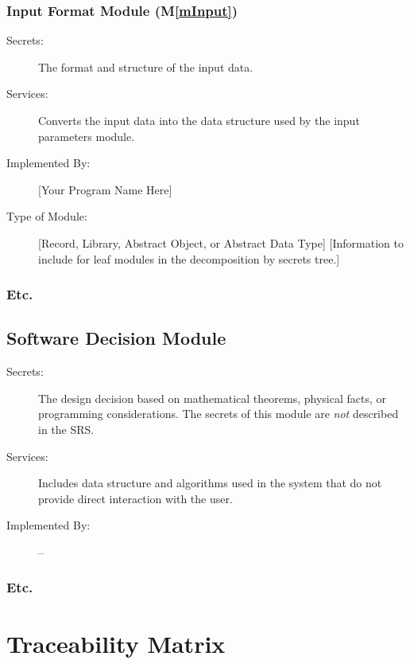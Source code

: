 \documentclass[12pt, titlepage]{article}
\newcommand{\mref}[1]{M\ref{#1}}
\begin{document}
\subsubsection{Input Format Module (\mref{mInput})}

\begin{description}
\item[Secrets:]The format and structure of the input data.
\item[Services:]Converts the input data into the data structure used by the
  input parameters module.
\item[Implemented By:] [Your Program Name Here]
\item[Type of Module:] [Record, Library, Abstract Object, or Abstract Data Type]
  [Information to include for leaf modules in the decomposition by secrets tree.]
\end{description}

\subsubsection{Etc.}


\subsection{Software Decision Module}

\begin{description}
\item[Secrets:] The design decision based on mathematical theorems, physical
  facts, or programming considerations. The secrets of this module are
  \emph{not} described in the SRS.
\item[Services:] Includes data structure and algorithms used in the system that
  do not provide direct interaction with the user. 
\item[Implemented By:] --
\end{description}

\subsubsection{Etc.}

\section{Traceability Matrix} \label{SecTM}
\end{document}
